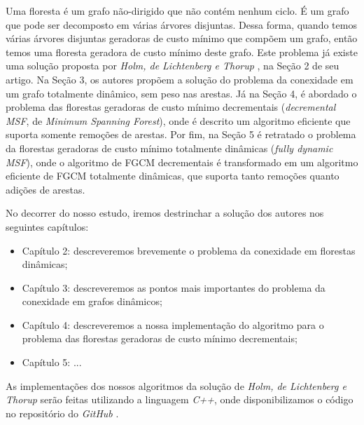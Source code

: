 Uma floresta é um grafo não-dirigido que não contém nenhum ciclo. É um grafo que pode ser decomposto em várias árvores disjuntas. Dessa forma, quando temos várias árvores disjuntas geradoras de custo mínimo que compõem um grafo, então temos uma floresta geradora de custo mínimo deste grafo. Este problema já existe uma solução proposta por \textit{Holm, de Lichtenberg e Thorup} \cite{jacob_holm}, na Seção 2 de seu artigo. Na Seção 3, os autores propõem a solução do problema da conexidade em um grafo totalmente dinâmico, sem peso nas arestas. Já na Seção 4, é abordado o problema das florestas geradoras de custo mínimo decrementais (\textit{decremental MSF}, de \textit{Minimum Spanning Forest}), onde é descrito um algoritmo eficiente que suporta somente remoções de arestas. Por fim, na Seção 5 é retratado o problema da florestas geradoras de custo mínimo totalmente dinâmicas (\textit{fully dynamic MSF}), onde o algoritmo de FGCM decrementais é transformado em um algoritmo eficiente de FGCM totalmente dinâmicas, que suporta tanto remoções quanto adições de arestas.

No decorrer do nosso estudo, iremos destrinchar a solução dos autores nos seguintes capítulos:

\begin{itemize}
    \item Capítulo 2: descreveremos brevemente o problema da conexidade em florestas dinâmicas;
    \item Capítulo 3: descreveremos as pontos mais importantes do problema da conexidade em grafos dinâmicos;
    \item Capítulo 4: descreveremos a nossa implementação do algoritmo para o problema das florestas geradoras de custo mínimo decrementais;
    \item Capítulo 5: ...  
\end{itemize}

As implementações dos nossos algoritmos da solução de \textit{Holm, de Lichtenberg e Thorup} \cite{jacob_holm} serão feitas utilizando a linguagem \textit{C++}, onde disponibilizamos o código no repositório do \textit{GitHub} \cite{chung2025}.